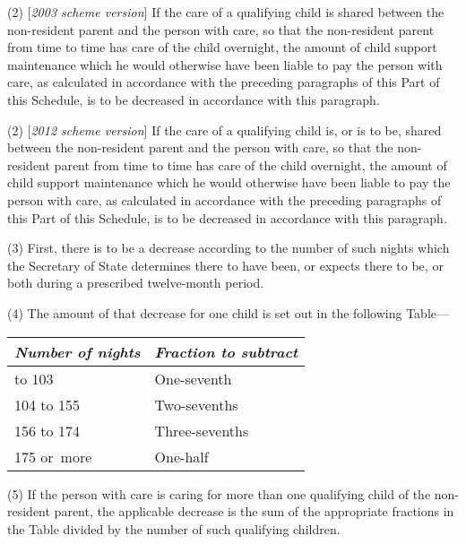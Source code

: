 \documentclass[12pt,a4paper]{article}
\begin{document}
(2) [\emph{2003 scheme version}] If the care of a qualifying child is shared between the non-resident parent and the person with care, so that the non-resident parent from time to time has care of the child overnight, the amount of child support maintenance which he would otherwise have been liable to pay the person with care, as calculated in accordance with the preceding paragraphs of this Part of this Schedule, is to be decreased in accordance with this paragraph.

(2) [\emph{2012 scheme version}] 
If the care of a qualifying child is, or is to be, shared  %
between the non-resident parent and the person with care, so that the non-resident parent from time to time has care of the child overnight, the amount of child support maintenance which he would otherwise have been liable to pay the person with care, as calculated in accordance with the preceding paragraphs of this Part of this Schedule, is to be decreased in accordance with this paragraph.

(3) First, there is to be a decrease according to the number of such nights which the 
Secretary of State  %
determines there to have been, or expects there to be, or both during a prescribed twelve-month period.

(4) The amount of that decrease for one child is set out in the following Table—

\medskip

{\footnotesize\noindent
\begin{longtable}{ll}
\hline
\itshape Number of nights	& \itshape Fraction to subtract\\
\hline
\endhead
\hline
\endlastfoot
52 to 103	&One-seventh\\
104 to 155	&Two-sevenths\\
156 to 174	&Three-sevenths\\
175 or~more	&One-half\\
\end{longtable}

}

\medskip

(5) If the person with care is caring for more than one qualifying child of the non-resident parent, the applicable decrease is the sum of the appropriate fractions in the Table divided by the number of such qualifying children.
\end{document}
